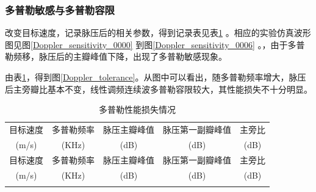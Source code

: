 \documentclass[12pt]{article}
\begin{document}
\subsubsection{多普勒敏感与多普勒容限}
改变目标速度，记录脉压后的相关参数，得到记录表见表\ref{tab:labeldop}
。相应的实验仿真波形图见图\ref{Doppler_sensitivity_0000}
到图\ref{Doppler_sensitivity_0006}
。，由于多普勒频移，脉压后的主瓣峰值下降，出现了多普勒敏感现象。\par
由表\ref{tab:labeldop}，得到图\ref{Doppler_tolerance}。从图中可以看出，随多普勒频率增大，脉压后主旁瓣比基本不变，线性调频连续波多普勒容限较大，其性能损失不十分明显。

\begin{longtable}{ccccc}
    \caption{多普勒性能损失情况}
    \label{tab:labeldop}  \\
    \hline
    目标速度 	&多普勒频率&脉压主瓣峰值&脉压第一副瓣峰值&主旁比\\
    (m/s)& (KHz)&(dB)&(dB)&(dB)\\
    \hline
    \endfirsthead

    \hline
    目标速度 	&多普勒频率&脉压主瓣峰值&脉压第一副瓣峰值&主旁比\\
    (m/s)& (KHz)&(dB)&(dB)&(dB)\\
    \hline
    \endhead


    \hline
    \endfoot


\end{longtable}
\end{document}
